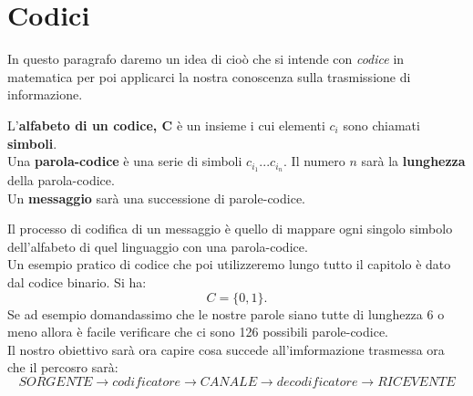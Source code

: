 \section{Codici}
\label{sec:Codici}
In questo paragrafo daremo un idea di cioò che si intende con \textit{codice} in matematica per poi applicarci la nostra conoscenza sulla trasmissione di informazione.\\
\begin{defi}
L'\textbf{alfabeto di un codice, C} è un insieme \acode i cui elementi $c_i$ sono chiamati \textbf{simboli}.\\
Una \textbf{parola-codice} è una serie di simboli $c_{i_1}...c_{i_n}$. Il numero $n$ sarà la \textbf{lunghezza} della parola-codice.\\
Un \textbf{messaggio} sarà una successione di parole-codice.
\end{defi}
Il processo di codifica di un messaggio è quello di mappare ogni singolo  simbolo dell'alfabeto di quel linguaggio con una parola-codice.\\
Un esempio pratico di codice che poi utilizzeremo lungo tutto il capitolo è dato dal codice binario. Si ha:
$$C=\{0, 1 \}.$$
Se ad esempio domandassimo che le nostre parole siano tutte di lunghezza 6 o meno allora è facile verificare che ci sono 126 possibili parole-codice.\\
Il nostro obiettivo sarà ora capire cosa succede all'imformazione trasmessa ora che il percosro sarà:
$$ SORGENTE \to codificatore \to CANALE \to decodificatore \to RICEVENTE$$












